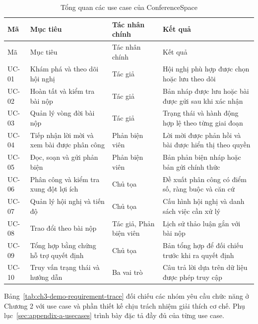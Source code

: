 \begingroup
\setlength{\tabcolsep}{2pt}
\begin{longtable}{|N{0.09\textwidth}|T{0.28\textwidth}|T{0.20\textwidth}|T{0.31\textwidth}|}
\caption{Tổng quan các use case của ConferenceSpace}\label{tab:ch3-demo-usecase-overview}\\
\hline
Mã & Mục tiêu & Tác nhân chính & Kết quả \\ \hline
\endfirsthead
\hline
Mã & Mục tiêu & Tác nhân chính & Kết quả \\ \hline
\endhead
UC-01 & Khám phá và theo dõi hội nghị & Tác giả & Hội nghị phù hợp được chọn hoặc lưu theo dõi \\ \hline
UC-02 & Hoàn tất và kiểm tra bài nộp & Tác giả & Bản nháp được lưu hoặc bài được gửi sau khi xác nhận \\ \hline
UC-03 & Quản lý vòng đời bài nộp & Tác giả & Trạng thái và hành động hợp lệ theo từng giai đoạn \\ \hline
UC-04 & Tiếp nhận lời mời và xem bài được phân công & Phản biện viên & Lời mời được phản hồi và bài được hiển thị theo quyền \\ \hline
UC-05 & Đọc, soạn và gửi phản biện & Phản biện viên & Bản phản biện nháp hoặc bản gửi chính thức \\ \hline
UC-06 & Phân công và kiểm tra xung đột lợi ích & Chủ tọa & Đề xuất phân công có điểm số, ràng buộc và căn cứ \\ \hline
UC-07 & Quản lý hội nghị và tiến độ & Chủ tọa & Cấu hình hội nghị và danh sách việc cần xử lý \\ \hline
UC-08 & Trao đổi theo bài nộp & Tác giả, Phản biện viên & Lịch sử thảo luận gắn với bài nộp \\ \hline
UC-09 & Tổng hợp bằng chứng hỗ trợ quyết định & Chủ tọa & Bản tổng hợp để đối chiếu trước khi ra quyết định \\ \hline
UC-10 & Truy vấn trạng thái và hướng dẫn & Ba vai trò & Câu trả lời dựa trên dữ liệu được phép truy cập \\ \hline
\end{longtable}
\endgroup

Bảng~\ref{tab:ch3-demo-requirement-trace} đối chiếu các nhóm yêu cầu chức năng ở Chương 2 với use case và phần thiết kế chịu trách nhiệm giải thích cơ chế. Phụ lục~\ref{sec:appendix-a-usecases} trình bày đặc tả đầy đủ của từng use case.

